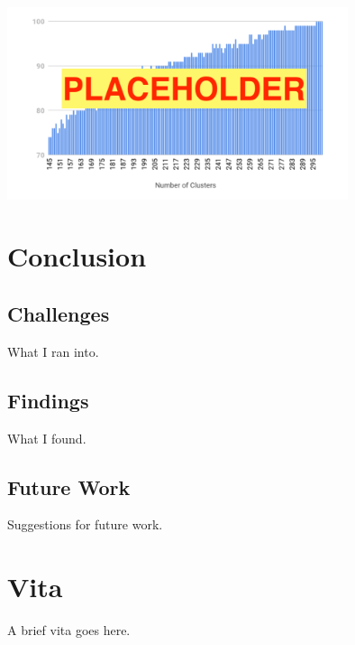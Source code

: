 \documentclass[final]{ukthesis}
\begin{document}
\begin{center}
\includegraphics[width=10cm]{placeholder}
\end{center}





%
%
%
\chapter{Conclusion}

\section{Challenges}
What I ran into.

\section{Findings}
What I found.

\section{Future Work}
Suggestions for future work.




\copyrightnotice
\backmatter

\chapter{Vita}
A brief vita goes here.
\end{document}

